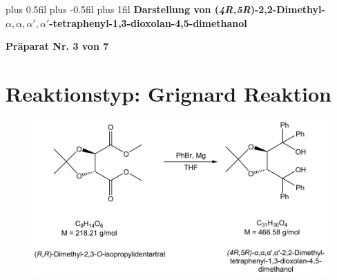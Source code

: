 \documentclass[12pt]{article}
\begin{document}
\begingroup
\leftskip=0cm plus 0.5fil \rightskip=0cm plus -0.5fil
\parfillskip=0cm plus 1fil
 \textbf{\large Darstellung von (\textit{4R,5R})-2,2-Dimethyl-$\alpha ,\alpha ,\alpha ',\alpha '$-tetraphenyl-1,3-dioxolan-4,5-dimethanol}\par
\endgroup

\begin{center}
 \textbf{Präparat Nr. 3 von 7}
\end{center}
\section{Reaktionstyp: \textnormal{Grignard Reaktion} }
\begin{figure}[ht]
\centering
\includegraphics[width=\textwidth]{reaktion.png}
\end{figure}
\end{document}
